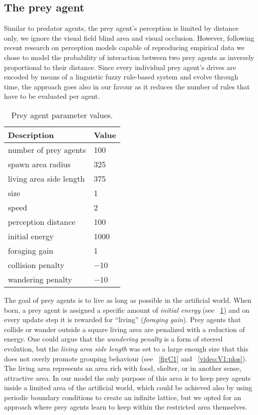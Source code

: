 \subsection{The prey agent}

Similar to predator agents, the prey agent's perception is limited by distance only, \ie we ignore the visual field blind area and visual occlusion. However, following recent research on perception models capable of reproducing empirical data \cite{bode2011limited,hemelrijk2015diffusion} we chose to model the probability of interaction between two prey agents as inversely proportional to their distance. Since every individual prey agent's drives are encoded by means of a linguistic fuzzy rule-based system and evolve through time, the approach goes also in our favour as it reduces the number of rules that have to be evaluated per agent.

\begin{table}
  \caption{Prey agent parameter values.}
  \label{tab:prey}
  \begin{tabular}{ll}
    \toprule
    Description & Value \\
    \midrule
    number of prey agents & 100 \\
    spawn area radius & 325 \\
    living area side length & 375 \\
    \hdashline
    size & 1 \\
    speed & 2 \\
    perception distance & 100 \\
    \hdashline
    initial energy & \num{1000} \\
    foraging gain & 1 \\
    collision penalty & \num{-10} \\
    wandering penalty & \num{-10} \\
    \bottomrule
  \end{tabular}
\end{table}

The goal of prey agents is to live as long as possible in the artificial world. When born, a prey agent is assigned a specific amount of \emph{initial energy} (see \tablename~\ref{tab:prey}) and on every update step it is rewarded for ``living'' (\emph{foraging gain}). Prey agents that collide or wander outside a square living area are penalized with a reduction of energy. One could argue that the \emph{wandering penalty} is a form of steered evolution, but the \emph{living area side length} was set to a large enough size that this does not overly promote grouping behaviour (see \figurename~\ref{figC1} and \videoname~\ref{video:V1:plos}). The living area represents an area rich with food, shelter, or in another sense, attractive area. In our model the only purpose of this area is to keep prey agents inside a limited area of the artificial world, which could be achieved also by using periodic boundary conditions to create an infinite lattice, but we opted for an approach where prey agents learn to keep within the restricted area themselves.

